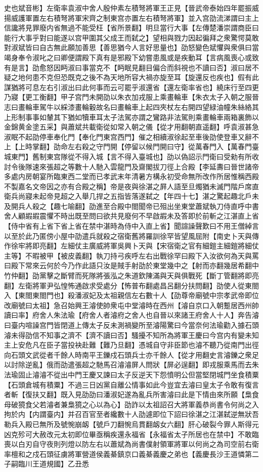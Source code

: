 史也斌音彬】左衛率袁淑中舍人殷仲素左積弩將軍王正見【晉武帝泰始四年罷振威揚威護軍置左右積弩將軍宋齊之制東宫亦置左右積弩將軍】並入宫劭流涕謂曰主上信讒將見罪廢内省無過不能受枉【省所景翻】明旦當行大事【左傳楚潘崇謂商臣曰能行大事乎對曰能遂以宫甲圍其父成王而弑之】望相與戮力因起徧拜之衆驚愕莫敢對淑斌皆曰自古無此願加善思【善思猶今人言好思量也】劭怒變色斌懼與衆俱曰當竭身奉令淑叱之曰卿便謂殿下真有是邪殿下幼嘗患風或是疾動耳【言病風喪心或致有是言】劭愈怒因眄淑曰事當克不【眄眠見翻目偏合而斜視也不讀曰否】淑曰居不疑之地何患不克但恐既克之後不為天地所容大禍亦旋至耳【旋還反也疾也】假有此謀猶將可息左右引淑出曰此何事而云可罷乎淑還省【還左衛率省也】繞床行至四更乃寢【更工衡翻】甲子宫門未開劭以朱衣加戎服上乘畫輪車【朱衣太子入朝之服晉志曰畫輪車駕牛以綵漆畫輪轂故名曰畫輪車上起四夾杖左右開四望緑油幢朱絲絡其上形制事事如輦其下猶如犢車耳太子法駕亦謂之鸞路非法駕則乘畫輪車兩箱裏飾以金錦黄金塗五采】與蕭斌共載衛從如常入朝之儀【從才用翻朝直遥翻】呼袁淑甚急淑眠不起劭停車奉化門【奉化門東宫西門】催之相續淑徐起至車後劭使登車又辭不上【上時掌翻】劭命左右殺之守門開【停留以候門開曰守】從萬春門入【萬春門臺城東門】舊制東宫隊從不得入城【言不得入臺城也】劭以偽詔示門衛曰受勑有所收討令後隊速來張超之等數十人馳入雲龍門及齋閣拔刀徑上合殿【李延夀曰晉世諸帝多處内房朝宴所臨東西二堂而已孝武末年清暑方構永初受命無所改作所居惟稱西殿不製嘉名文帝因之亦有合殿之稱】帝是夜與徐湛之屛人語至旦燭猶未滅門階戶席直衛兵尚寢未起帝見超之入舉几捍之五指皆落遂弑之【年四十七】湛之驚起趣北戶未及開兵人殺之【趣七喻翻】劭進至合殿中閤聞帝已殂出坐東堂蕭斌執刀侍直呼中書舍人顧嘏嘏震懼不時出既至問曰欲共見廢何不早啟嘏未及答即於前斬之江湛直上省【侍中省有上省下省上省在禁中湛時為侍中入直上省】聞諠譟聲歎曰不用王僧綽言以至於此乃匿傍小屋中劭遣兵就殺之宿衛舊將羅訓徐罕皆望風屈附【南史卜天與傳作徐牢將即亮翻】左細仗主廣威將軍吳興卜天與【宋宿衛之官有細鎧主細鎧將細仗主等】不暇被甲【被皮義翻】執刀持弓疾呼左右出戰徐罕曰殿下入汝欲何為天與罵曰殿下常來云何於今乃作此語只汝是賊手射劭於東堂幾中之【射而亦翻幾居希翻中竹仲翻】劭黨擊之斷臂而死隊將張泓之朱道欽陳滿與天與俱戰死【斷丁管翻將即亮翻】左衛將軍尹弘惶怖通啟求受處分【怖普布翻處昌呂翻分扶問翻】劭使人從東閤入【東閤東閤門也】殺潘淑妃及太祖親信左右數十人【劭尊帝廟號中宗孝武帝即位改廟號曰太祖】急召始興王濬使帥衆屯中堂濬時在西州【濬自京口入朝蹔居西州帥讀曰率】府舍人朱法瑜【府舍人者濬府之舍人也自晉以來諸王府舍人十人】奔告濬曰臺内喧譟宫門皆閉道上傳太子反未測禍變所至濬陽驚曰今當奈何法瑜勸入據石頭濬未得劭信不知事之濟不【濟不讀曰否】騷擾不知所為將軍王慶曰今宫内有變未知主上安危凡在臣子當投袂赴難【難乃旦翻】憑城自守非臣節也濬不聽乃從南門出徑向石頭文武從者千餘人時南平王鑠戍石頭兵士亦千餘人【從才用翻史言濬鑠之衆足以討除逆亂】俄而劭遣張超之馳馬召濬濬屏人問狀【屏必逞翻】即戎服乘馬而去朱法瑜固止濬濬不從出中門王慶又諫曰太子反逆天下怨憤明公但當堅閉城門坐食積粟【石頭倉城有積粟】不過三日凶黨自離公情事如此今豈宜去濬曰皇太子令敢有復言者斬【復扶又翻】既入見劭劭曰潘淑妃遂為亂兵所害濬曰此是下情由來所願【梟食母破獍食父若濬者兼梟獍之心以為心】劭詐以太祖詔召大將軍義恭尚書令何尚之入拘於内【内謂臺内】并召百官至者纔數十人劭遽即位下詔曰徐湛之江湛弑逆無狀吾勒兵入殿已無所及號惋崩衂【號戶刀翻惋烏貫翻衂女六翻】肝心破裂今罪人斯得元凶克殄可大赦改元太初即位畢亟稱疾還永福省【永福省太子所居也在禁中】不敢臨喪以白刃自守夜則列燈以防左右以蕭斌為尚書僕射領軍將軍以何尚之為司空前右衛率檀和之戍石頭征虜將軍營道侯義綦鎮京口義綦義慶之弟也【義慶長沙王道憐第二子嗣臨川王道規國】乙丑悉